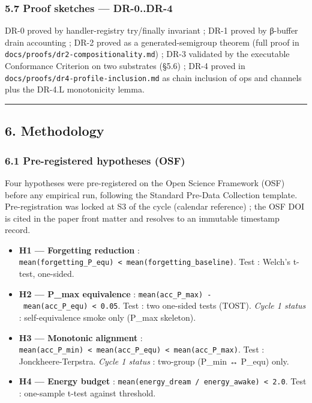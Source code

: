 \documentclass[
]{article}
\providecommand{\tightlist}{%
  \setlength{\itemsep}{0pt}\setlength{\parskip}{0pt}}
\begin{document}
\subsubsection{5.7 Proof sketches ---
DR-0..DR-4}\label{proof-sketches-dr-0..dr-4}

DR-0 proved by handler-registry try/finally invariant ; DR-1 proved by
β-buffer drain accounting ; DR-2 proved as a generated-semigroup theorem
(full proof in \texttt{docs/proofs/dr2-compositionality.md}) ; DR-3
validated by the executable Conformance Criterion on two substrates
(§5.6) ; DR-4 proved in \texttt{docs/proofs/dr4-profile-inclusion.md} as
chain inclusion of ops and channels plus the DR-4.L monotonicity lemma.

\begin{center}\rule{0.5\linewidth}{0.5pt}\end{center}

\subsection{6. Methodology}\label{methodology}

\subsubsection{6.1 Pre-registered hypotheses
(OSF)}\label{pre-registered-hypotheses-osf}

Four hypotheses were pre-registered on the Open Science Framework (OSF)
before any empirical run, following the Standard Pre-Data Collection
template. Pre-registration was locked at S3 of the cycle (calendar
reference) ; the OSF DOI is cited in the paper front matter and resolves
to an immutable timestamp record.

\begin{itemize}
\tightlist
\item
  \textbf{H1 --- Forgetting reduction} :
  \texttt{mean(forgetting\_P\_equ)\ \textless{}\ mean(forgetting\_baseline)}.
  Test : Welch's t-test, one-sided.
\item
  \textbf{H2 --- P\_max equivalence} :
  \texttt{\textbar{}mean(acc\_P\_max)\ -\ mean(acc\_P\_equ)\textbar{}\ \textless{}\ 0.05}.
  Test : two one-sided tests (TOST). \emph{Cycle 1 status} :
  self-equivalence smoke only (P\_max skeleton).
\item
  \textbf{H3 --- Monotonic alignment} :
  \texttt{mean(acc\_P\_min)\ \textless{}\ mean(acc\_P\_equ)\ \textless{}\ mean(acc\_P\_max)}.
  Test : Jonckheere-Terpstra. \emph{Cycle 1 status} : two-group (P\_min
  ↔ P\_equ) only.
\item
  \textbf{H4 --- Energy budget} :
  \texttt{mean(energy\_dream\ /\ energy\_awake)\ \textless{}\ 2.0}. Test
  : one-sample t-test against threshold.
\end{itemize}
\end{document}
